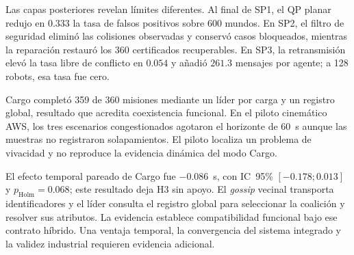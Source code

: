 Las capas posteriores revelan límites diferentes. Al final de SP1, el QP planar redujo en \(0.333\) la tasa de falsos positivos sobre 600 mundos. En SP2, el filtro de seguridad eliminó las colisiones observadas y conservó casos bloqueados, mientras la reparación restauró los 360 certificados recuperables. En SP3, la retransmisión elevó la tasa libre de conflicto en \(0.054\) y añadió \(261.3\) mensajes por agente; a 128 robots, esa tasa fue cero.

Cargo completó 359 de 360 misiones mediante un líder por carga y un registro global, resultado que acredita coexistencia funcional. En el piloto cinemático AWS, los tres escenarios congestionados agotaron el horizonte de \(60\)~s aunque las muestras no registraron solapamientos. El piloto localiza un problema de vivacidad y no reproduce la evidencia dinámica del modo Cargo.


El efecto temporal pareado de Cargo fue \(-0.086\)~s, con IC~95\% \([-0.178;0.013]\) y \(p_{\mathrm{Holm}}=0.068\); este resultado deja H3 sin apoyo. El \emph{gossip} vecinal transporta identificadores y el líder consulta el registro global para seleccionar la coalición y resolver sus atributos. La evidencia establece compatibilidad funcional bajo ese contrato híbrido. Una ventaja temporal, la convergencia del sistema integrado y la validez industrial requieren evidencia adicional.
